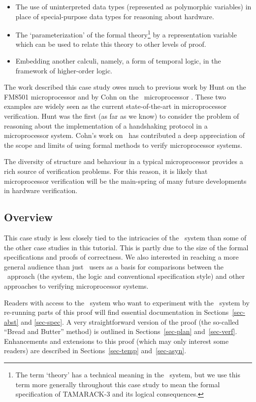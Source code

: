 \begin{itemize}
\item
The use of uninterpreted data types (represented as polymorphic variables)
in place of special-purpose data types for
reasoning about hardware.
\item
The `parameterization' of the formal
theory\footnote{
The term `theory' has a technical meaning in the \HOL\ system,
but we use this term more generally throughout this case study to
mean the formal specification of \mbox{\scriptsize TAMARACK-3} and
its logical consequences.}
by a representation variable which can be used
to relate this theory to other levels of proof.
\item
Embedding another calculi, namely, a form of temporal logic,
in the framework of higher-order logic.
\end{itemize}

The work described this case study owes much to
previous work by Hunt on the FM8501 microprocessor
\cite{Hunt:thesis,Bevier87,Bevier89} and by Cohn on the
\Viper\ microprocessor
\cite{Cohn:calgary86,Cohn:banff87,Cohn:jar}.
These two examples are widely seen as the current
state-of-the-art in microprocessor verification.
Hunt was the first (as far as we know) to consider
the problem of reasoning about the
implementation of a handshaking protocol
in a microprocessor system.
Cohn's work on \Viper\ has contributed a deep appreciation
of the scope and limits of using formal methods
to verify microprocessor systems.

The diversity of structure and behaviour in a typical microprocessor
provides a rich source of verification problems.
For this reason, it is likely
that microprocessor verification will be the main-spring of many future
developments in hardware verification.

\subsection{Overview}

This case study is less closely tied to
the intricacies of the \HOL\ system
than some of the other case studies in this tutorial.
This is partly due to the size of the formal specifications
and proofs of correctness.
We also interested in reaching a more general audience
than just \HOL\ users
as a basis for comparisons between the \HOL\ approach
(the system, the logic and conventional specification style)
and other approaches to verifying microprocessor systems.

Readers with access to the \HOL\ system who
want to experiment with the \HOL\ system by re-running
parts of this proof will find
essential documentation in
Sections~\ref{sec-abst} and \ref{sec-spec}.
A very straightforward version of the proof
(the so-called ``Bread and Butter'' method) is outlined
in Sections~\ref{sec-plan} and~\ref{sec-verf}.
Enhancements and extensions to this proof
(which may only interest some readers)
are described in Sections~\ref{sec-temp} and~\ref{sec-asyn}.

